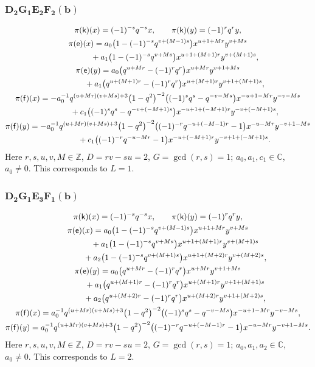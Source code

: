 \documentclass[10pt,a4paper]{amsart}
\numberwithin{equation}{section}
\begin{document}
\subsubsection*{$\boldsymbol{D_2G_1E_2F_2(b)}$}
\begin{gather*}
\pi(\mathsf{k})(x)= (-1)^{-s}q^{-s}x ,\qquad\pi(\mathsf{k})(y)=(-1)^rq^ry ,\\
\pi(\mathsf{e})(x)= a_0\big(1-(-1)^{-s}q^{v+(M-1)s}\big)x^{u+1+Mr}y^{v+Ms}\\
\hphantom{\pi(\mathsf{e})(x)=}{} + a_1\big(1-(-1)^{-s}q^{v+Ms}\big)x^{u+1+(M+1)r}y^{v+(M+1)s} ,\\
\pi(\mathsf{e})(y)= a_0\big(q^{u+Mr}-(-1)^rq^r\big)x^{u+Mr}y^{v+1+Ms}\\
\hphantom{\pi(\mathsf{e})(y)=}{} + a_1\big(q^{u+(M+1)r}-(-1)^rq^r\big)x^{u+(M+1)r}y^{v+1+(M+1)s} ,\\
\pi(\mathsf{f})(x)= -a_0^{-1}q^{(u+Mr)(v+Ms)+3}\big(1-q^2\big)^{-2}\big((-1)^sq^s-q^{-v-Ms}\big)x^{-u+1-Mr}y^{-v-Ms}\\
\hphantom{\pi(\mathsf{f})(x)=}{} + c_1\big((-1)^sq^s-q^{-v+(-M+1)s}\big)x^{-u+1+(-M+1)r}y^{-v+(-M+1)s} ,\\
\pi(\mathsf{f})(y)= -a_0^{-1}q^{(u+Mr)(v+Ms)+3}\big(1-q^2\big)^{-2}\big((-1)^{-r}q^{-u+(-M-1)r}-1\big) x^{-u-Mr}y^{-v+1-Ms}\\
\hphantom{\pi(\mathsf{f})(y)=}{}+ c_1\big((-1)^{-r}q^{-u-Mr}-1\big)x^{-u+(-M+1)r}y^{-v+1+(-M+1)s} .
\end{gather*}
Here $r,s,u,v,M\in\mathbb{Z}$, $D=rv-su=2$, $G=\operatorname{gcd}(r,s)=1$; $a_0,a_1,c_1\in\mathbb{C}$, $a_0\ne 0$. This corresponds to $L=1$.

\subsubsection*{$\boldsymbol{D_2G_1E_3F_1(b)}$}
\begin{gather*}
\pi(\mathsf{k})(x)= (-1)^{-s}q^{-s}x ,\qquad\pi(\mathsf{k})(y)=(-1)^rq^ry ,\\
\pi(\mathsf{e})(x)= a_0\big(1-(-1)^{-s}q^{v+(M-1)s}\big)x^{u+1+Mr}y^{v+Ms}\\
\hphantom{\pi(\mathsf{e})(x)=}{} + a_1\big(1-(-1)^{-s}q^{v+Ms}\big)x^{u+1+(M+1)r}y^{v+(M+1)s}\\
\hphantom{\pi(\mathsf{e})(x)=}{} + a_2\big(1-(-1)^{-s}q^{v+(M+1)s}\big)x^{u+1+(M+2)r}y^{v+(M+2)s} ,\\
\pi(\mathsf{e})(y)= a_0\big(q^{u+Mr}-(-1)^rq^r\big)x^{u+Mr}y^{v+1+Ms}\\
\hphantom{\pi(\mathsf{e})(y)=}{} + a_1\big(q^{u+(M+1)r}-(-1)^rq^r\big)x^{u+(M+1)r}y^{v+1+(M+1)s}\\
\hphantom{\pi(\mathsf{e})(y)=}{} + a_2\big(q^{u+(M+2)r}-(-1)^rq^r\big)x^{u+(M+2)r}y^{v+1+(M+2)s} ,\\
\pi(\mathsf{f})(x)= a_0^{-1}q^{(u+Mr)(v+Ms)+3}\big(1-q^2\big)^{-2}\big((-1)^sq^s-q^{-v-Ms}\big)x^{-u+1-Mr}y^{-v-Ms} ,\\
\pi(\mathsf{f})(y)= a_0^{-1}q^{(u+Mr)(v+Ms)+3}\big(1-q^2\big)^{-2}\big((-1)^{-r}q^{-u+(-M-1)r}-1\big)x^{-u-Mr}y^{-v+1-Ms} .
\end{gather*}
Here $r,s,u,v,M\in\mathbb{Z}$, $D=rv-su=2$, $G=\operatorname{gcd}(r,s)=1$; $a_0,a_1,a_2\in\mathbb{C}$, $a_0\ne 0$. This corresponds to $L=2$.
\end{document}
